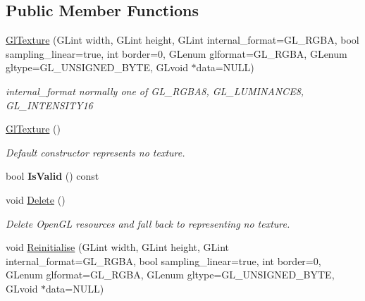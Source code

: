 \subsection*{Public Member Functions}
\begin{DoxyCompactItemize}
\item 
\hyperlink{classpangolin_1_1_gl_texture_addf883bdafe29c5135ef0990fc7ef3cd}{Gl\+Texture} (G\+Lint width, G\+Lint height, G\+Lint internal\+\_\+format=G\+L\+\_\+\+R\+G\+BA, bool sampling\+\_\+linear=true, int border=0, G\+Lenum glformat=G\+L\+\_\+\+R\+G\+BA, G\+Lenum gltype=G\+L\+\_\+\+U\+N\+S\+I\+G\+N\+E\+D\+\_\+\+B\+Y\+TE, G\+Lvoid $\ast$data=N\+U\+LL)\hypertarget{classpangolin_1_1_gl_texture_addf883bdafe29c5135ef0990fc7ef3cd}{}\label{classpangolin_1_1_gl_texture_addf883bdafe29c5135ef0990fc7ef3cd}

\begin{DoxyCompactList}\small\item\em internal\+\_\+format normally one of G\+L\+\_\+\+R\+G\+B\+A8, G\+L\+\_\+\+L\+U\+M\+I\+N\+A\+N\+C\+E8, G\+L\+\_\+\+I\+N\+T\+E\+N\+S\+I\+T\+Y16 \end{DoxyCompactList}\item 
\hyperlink{classpangolin_1_1_gl_texture_a009961fdb69716e2f00ead3a9aee0e15}{Gl\+Texture} ()\hypertarget{classpangolin_1_1_gl_texture_a009961fdb69716e2f00ead3a9aee0e15}{}\label{classpangolin_1_1_gl_texture_a009961fdb69716e2f00ead3a9aee0e15}

\begin{DoxyCompactList}\small\item\em Default constructor represents \textquotesingle{}no texture\textquotesingle{}. \end{DoxyCompactList}\item 
bool {\bfseries Is\+Valid} () const \hypertarget{classpangolin_1_1_gl_texture_ad860c1ffa1fc1a699aeb0c2e49efbe71}{}\label{classpangolin_1_1_gl_texture_ad860c1ffa1fc1a699aeb0c2e49efbe71}

\item 
void \hyperlink{classpangolin_1_1_gl_texture_aa2d520d9d1f2d68166bcdc6ce7b7eb33}{Delete} ()\hypertarget{classpangolin_1_1_gl_texture_aa2d520d9d1f2d68166bcdc6ce7b7eb33}{}\label{classpangolin_1_1_gl_texture_aa2d520d9d1f2d68166bcdc6ce7b7eb33}

\begin{DoxyCompactList}\small\item\em Delete Open\+GL resources and fall back to representing \textquotesingle{}no texture\textquotesingle{}. \end{DoxyCompactList}\item 
void \hyperlink{classpangolin_1_1_gl_texture_ac130d85fde9b0936b5b57dd174fde6df}{Reinitialise} (G\+Lint width, G\+Lint height, G\+Lint internal\+\_\+format=G\+L\+\_\+\+R\+G\+BA, bool sampling\+\_\+linear=true, int border=0, G\+Lenum glformat=G\+L\+\_\+\+R\+G\+BA, G\+Lenum gltype=G\+L\+\_\+\+U\+N\+S\+I\+G\+N\+E\+D\+\_\+\+B\+Y\+TE, G\+Lvoid $\ast$data=N\+U\+LL)\hypertarget{classpangolin_1_1_gl_texture_ac130d85fde9b0936b5b57dd174fde6df}{}\label{classpangolin_1_1_gl_texture_ac130d85fde9b0936b5b57dd174fde6df}


\end{DoxyCompactItemize}
